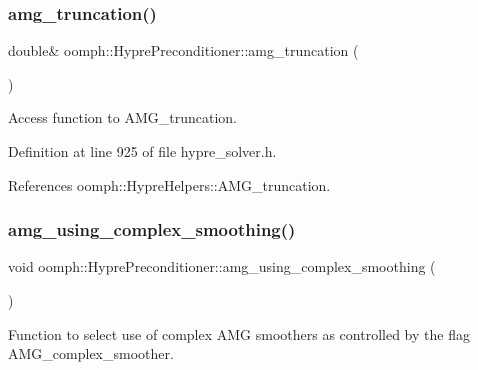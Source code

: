 \mbox{\label{classoomph_1_1HyprePreconditioner_a7394e9282d8422f8658966c5606bdb84}} 
\subsubsection{\texorpdfstring{amg\+\_\+truncation()}{amg\_truncation()}}
{\footnotesize\ttfamily double\& oomph\+::\+Hypre\+Preconditioner\+::amg\+\_\+truncation (\begin{DoxyParamCaption}{ }\end{DoxyParamCaption})\hspace{0.3cm}{\ttfamily [inline]}}



Access function to A\+M\+G\+\_\+truncation. 



Definition at line 925 of file hypre\+\_\+solver.\+h.



References oomph\+::\+Hypre\+Helpers\+::\+A\+M\+G\+\_\+truncation.

\mbox{\label{classoomph_1_1HyprePreconditioner_a65c4923b3332f92c1712a1da86d1da9e}} 
\subsubsection{\texorpdfstring{amg\+\_\+using\+\_\+complex\+\_\+smoothing()}{amg\_using\_complex\_smoothing()}}
{\footnotesize\ttfamily void oomph\+::\+Hypre\+Preconditioner\+::amg\+\_\+using\+\_\+complex\+\_\+smoothing (\begin{DoxyParamCaption}{ }\end{DoxyParamCaption})\hspace{0.3cm}{\ttfamily [inline]}}



Function to select use of \textquotesingle{}complex\textquotesingle{} A\+MG smoothers as controlled by the flag A\+M\+G\+\_\+complex\+\_\+smoother. 



